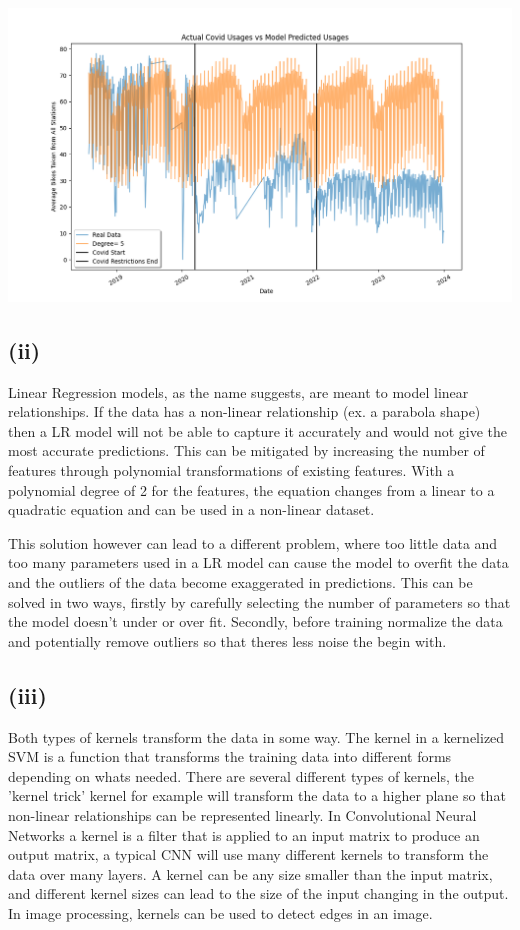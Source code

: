 \documentclass{article}
\begin{document}
\begin{center}
\includegraphics[width=1\linewidth]{covidDif5}
\end{center}

\subsection{(ii)}
Linear Regression models, as the name suggests, are meant to model linear relationships. If the data has a non-linear relationship (ex. a parabola shape) then a LR model will not be able to capture it accurately and would not give the most accurate predictions. This can be mitigated by increasing the number of features through polynomial transformations of existing features. With a polynomial degree of 2 for the features, the equation changes from a linear to a quadratic equation and can be used in a non-linear dataset.

This solution however can lead to a different problem, where too little data and too many parameters used in a LR model can cause the model to overfit the data and the outliers of the data become exaggerated in predictions. This can be solved in two ways, firstly by carefully selecting the number of parameters so that the model doesn't under or over fit. Secondly, before training normalize the data and potentially remove outliers so that theres less noise the begin with.

\subsection{(iii)}
Both types of kernels transform the data in some way. The kernel in a kernelized SVM is a function that transforms the training data into different forms depending on whats needed. There are several different types of kernels, the 'kernel trick' kernel for example will transform the data to a higher plane so that non-linear relationships can be represented linearly. In Convolutional Neural Networks a kernel is a filter that is applied to an input matrix to produce an output matrix, a typical CNN will use many different kernels to transform the data over many layers. A kernel can be any size smaller than the input matrix, and different kernel sizes can lead to the size of the input changing in the output. In image processing, kernels can be used to detect edges in an image. 
\end{document}
